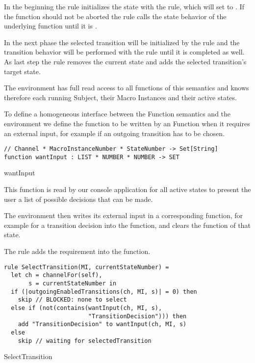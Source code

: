 In the beginning the  rule initializes the state with the  rule, which will set  to . If the function should not be aborted the  rule calls the state behavior of the underlying function until it is .

In the next phase the selected transition will be initialized by the  rule and the transition behavior will be performed with the  rule until it is completed as well. As last step the  rule removes the current state and adds the selected transition's target state.


The environment has full read access to all functions of this semantics and knows therefore each running Subject, their Macro Instances and their active states.

To define a homogeneous interface between the Function semantics and the environment we define the function  to be written by an Function when it requires an external input, for example if an outgoing transition has to be chosen.



\begin{listing}[htbp]
\begin{verbatim}
// Channel * MacroInstanceNumber * StateNumber -> Set[String]
function wantInput : LIST * NUMBER * NUMBER -> SET
\end{verbatim}
\caption{wantInput}
\label{lst:shortasm:wantInput}
\end{listing}


This function is read by our console application for all active states to present the user a list of possible decisions that can be made.

The environment then writes its external input in a corresponding function, for example for a transition decision into the  function, and clears the  function of that state.

The  rule adds the  requirement into the  function.


\begin{listing}[htbp]
\begin{verbatim}
rule SelectTransition(MI, currentStateNumber) =
  let ch = channelFor(self),
       s = currentStateNumber in
  if (|outgoingEnabledTransitions(ch, MI, s)| = 0) then
    skip // BLOCKED: none to select
  else if (not(contains(wantInput(ch, MI, s),
                        "TransitionDecision"))) then
    add "TransitionDecision" to wantInput(ch, MI, s)
  else
    skip // waiting for selectedTransition
\end{verbatim}
\caption{SelectTransition}
\label{lst:shortasm:SelectTransition}
\end{listing}


